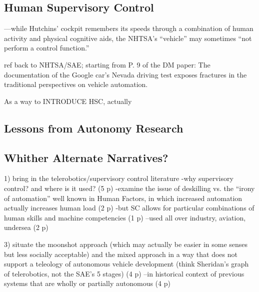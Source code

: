\subsection{Human Supervisory Control}

—while Hutchins' cockpit
remembers its speeds through a combination of human activity and
physical cognitive aids,\cite{???} the NHTSA's “vehicle” may sometimes “not
perform a control function.”\cite{???}

ref back to NHTSA/SAE; starting from P. 9 of the DM paper: The documentation of the Google car's Nevada driving test
exposes fractures in the traditional perspectives on vehicle
automation.\cite{???} 

As a way to INTRODUCE HSC, actually

\subsection{Lessons from Autonomy Research}

\subsection{Whither Alternate Narratives?}



1) bring in the telerobotics/supervisory control literature
-why supervisory control? and where is it used? (5 p)
-examine the issue of deskilling vs. the ``irony of automation'' well
known in Human Factors, in which increased automation actually
increases human load (2 p)
-but SC allows for particular combinations of human skills and machine
competencies (1 p)
--used all over industry, aviation, undersea (2 p)


3) situate the moonshot approach (which may actually be easier in some
senses but less socially acceptable) and the mixed approach in a way
that does not support a teleology of autonomous vehicle development
(think Sheridan's graph of telerobotics, not the SAE's 5 stages) (4 p)
--in historical context of previous systems that are wholly or
partially autonomous (4 p)





